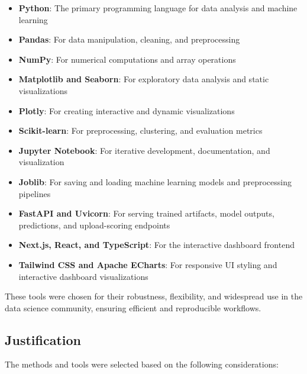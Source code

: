 \documentclass[12pt,a4paper]{article}
\begin{document}
\begin{itemize}
    \item \textbf{Python}: The primary programming language for data analysis and machine learning
    \item \textbf{Pandas}: For data manipulation, cleaning, and preprocessing
    \item \textbf{NumPy}: For numerical computations and array operations
    \item \textbf{Matplotlib and Seaborn}: For exploratory data analysis and static visualizations
    \item \textbf{Plotly}: For creating interactive and dynamic visualizations
    \item \textbf{Scikit-learn}: For preprocessing, clustering, and evaluation metrics
    \item \textbf{Jupyter Notebook}: For iterative development, documentation, and visualization
    \item \textbf{Joblib}: For saving and loading machine learning models and preprocessing pipelines
    \item \textbf{FastAPI and Uvicorn}: For serving trained artifacts, model outputs, predictions, and upload-scoring endpoints
    \item \textbf{Next.js, React, and TypeScript}: For the interactive dashboard frontend
    \item \textbf{Tailwind CSS and Apache ECharts}: For responsive UI styling and interactive dashboard visualizations
\end{itemize}

These tools were chosen for their robustness, flexibility, and widespread use in the data science community, ensuring efficient and reproducible workflows.

\subsection{Justification}
The methods and tools were selected based on the following considerations:
\end{document}
